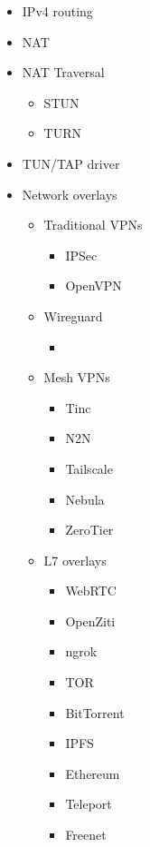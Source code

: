 \begin{itemize}
\tightlist
\item
  IPv4 routing
\item
  NAT
\item
  NAT Traversal

  \begin{itemize}
  \tightlist
  \item
    STUN
  \item
    TURN
  \end{itemize}
\item
  TUN/TAP driver
\item
  Network overlays

  \begin{itemize}
  \tightlist
  \item
    Traditional VPNs

    \begin{itemize}
    \tightlist
    \item
      IPSec
    \item
      OpenVPN
    \end{itemize}
  \item
    Wireguard

    \begin{itemize}
    \tightlist
    \item
    \end{itemize}
  \item
    Mesh VPNs

    \begin{itemize}
    \tightlist
    \item
      Tinc
    \item
      N2N
    \item
      Tailscale
    \item
      Nebula
    \item
      ZeroTier
    \end{itemize}
  \item
    L7 overlays

    \begin{itemize}
    \tightlist
    \item
      WebRTC
    \item
      OpenZiti
    \item
      ngrok
    \item
      TOR
    \item
      BitTorrent
    \item
      IPFS
    \item
      Ethereum
    \item
      Teleport
    \item
      Freenet
    \end{itemize}
  \end{itemize}
\end{itemize}

